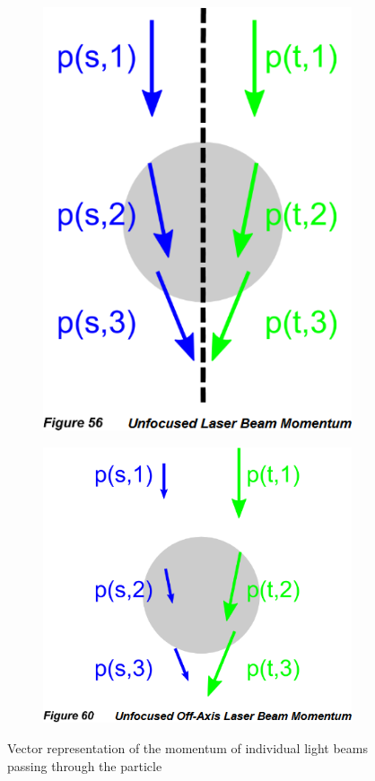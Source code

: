 \documentclass{article}
\begin{document}
\begin{figure}[!ht]
    \centering
    \begin{subfigure}{0.49\textwidth}
        \centering
        \includegraphics[height=0.5\textwidth]{laserSymmetricalBeams.png}
    \end{subfigure}
    \begin{subfigure}{0.49\textwidth}
        \centering
        \includegraphics[height=0.5\textwidth]{laserAsymmetricalBeams.png}
    \end{subfigure}
    \caption{Vector representation of the momentum of individual light beams passing through the particle}
    \label{fig:unfocusedLaserMomChg}
\end{figure}
\FloatBarrier
\end{document}
